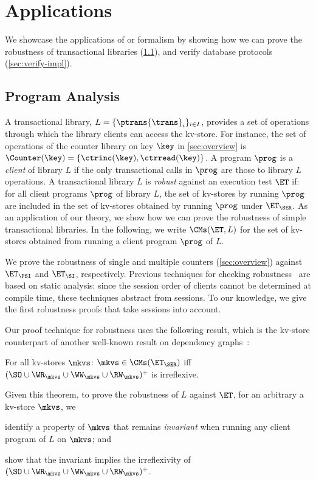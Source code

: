 \section{Applications}
\label{sec:applications}

We showcase the applications of or formalism by showing how we can prove the robustness of transactional libraries (\cref{sec:program-analysis}), and verify database protocols
 (\cref{sec:verify-impl}).

\subsection{Program Analysis}
\label{sec:program-analysis}
A transactional library, $L = \{\ptrans{\trans}_{i}\}_{i \in I}$, 
provides a set of operations through which the library clients can access the kv-store. 
For instance, the set of operations of the counter library on key $\key$ in \cref{sec:overview} is $\Counter(\key) = \{\ctrinc(\key), \ctrread(\key)\}$.
A program $\prog$ is a \emph{client} of library $L$ if the only transactional calls in $\prog$ are those to library $L$ operations.  
A transactional library $L$ is \emph{robust} against an execution test $\ET$ if: 
for all client programs $\prog$ of library $L$, the set of kv-stores by running $\prog$ are included in the set of kv-stores obtained by running $\prog$ under $\ET_{\SER}$.
As an application of our theory, we show how we can prove the robustness of simple transactional libraries. 
In the following, we write $\CMs(\ET, L)$ for the set of kv-stores obtained from running a client program $\prog$ of $L$. 

We prove the robustness of single and multiple counters (\cref{sec:overview}) against $\ET_{\PSI}$ and $\ET_{\SI}$, respectively.
Previous techniques for checking robustness~\cite{giovanni_concur16,SIanalysis,laws,sureshConcur} 
are based on static analysis: since the session order of clients cannot be determined at compile 
time, these techniques abstract from sessions. 
To our knowledge, we give the first robustness proofs that take sessions into account.

Our proof technique for robustness uses the following result, which is the kv-store counterpart of another well-known result on dependency graphs~\cite{adya}:
\begin{theorem}
\label{thm:serialisable_nocycle}
For all kv-stores $\mkvs$: $\mkvs \in \CMs(\ET_{\SER})$ iff $(\SO \cup \WR_{\mkvs} 
\cup \WW_{\mkvs} \cup \RW_{\mkvs})^{+}$ is irreflexive.
\end{theorem}
Given this theorem, to prove the robustness of $L$ against $\ET$, 
for an arbitrary a kv-store $\mkvs$, we 
\begin{enumerate*}
	\item identify a property of $\mkvs$ that remains \emph{invariant} when running any client program of $L$ on $\mkvs$; and 
	\item show that the invariant implies the irreflexivity of $(\SO \cup \WR_{\mkvs} \cup \WW_{\mkvs} \cup \RW_{\mkvs})^{+}$.
\end{enumerate*}


